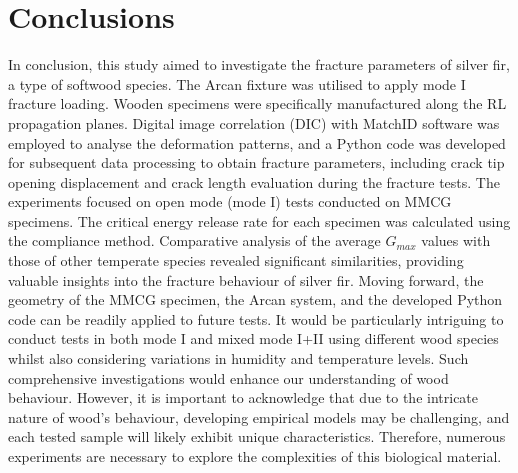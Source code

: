 \documentclass[3p,times,procedia]{elsarticle}
\begin{document}


\section{Conclusions}\label{S:con}

In conclusion, this study aimed to investigate the fracture parameters of silver fir, a type of softwood species. The Arcan fixture was utilised to apply mode I fracture loading. Wooden specimens were specifically manufactured along the RL propagation planes. Digital image correlation (DIC) with MatchID software was employed to analyse the deformation patterns, and a Python code was developed for subsequent data processing to obtain fracture parameters, including crack tip opening displacement and crack length evaluation during the fracture tests.
The experiments focused on open mode (mode I) tests conducted on MMCG specimens. The critical energy release rate for each specimen was calculated using the compliance method. Comparative analysis of the average $G_{max}$ values with those of other temperate species revealed significant similarities, providing valuable insights into the fracture behaviour of silver fir.
Moving forward, the geometry of the MMCG specimen, the Arcan system, and the developed Python code can be readily applied to future tests. It would be particularly intriguing to conduct tests in both mode I and mixed mode I+II using different wood species whilst also considering variations in humidity and temperature levels. Such comprehensive investigations would enhance our understanding of wood behaviour. However, it is important to acknowledge that due to the intricate nature of wood's behaviour, developing empirical models may be challenging, and each tested sample will likely exhibit unique characteristics. Therefore, numerous experiments are necessary to explore the complexities of this biological material.
\end{document}
